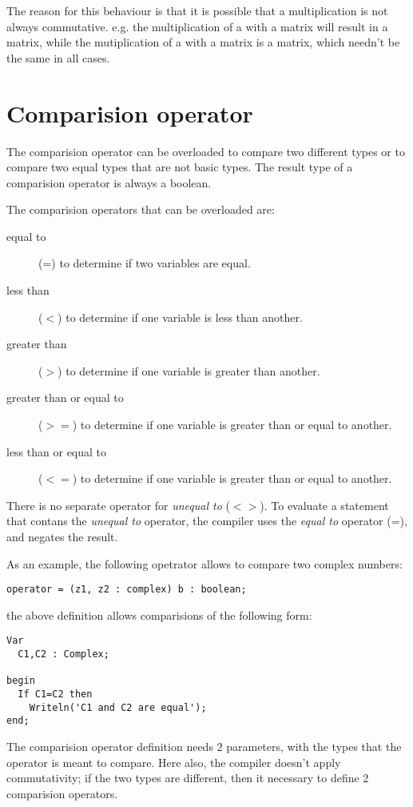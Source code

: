 \documentclass{report}
\begin{document}
The reason for this behaviour is that it is possible that a multiplication
is not always commutative. e.g. the multiplication of a  with a
 matrix will result in a  matrix, while the
mutiplication of a  with a  matrix is a 
matrix, which needn't be the same in all cases.

\section{Comparision operator}
The comparision operator can be overloaded to compare two different types
or to compare two equal types that are not basic types. The result type of
a comparision operator is always a boolean.

The comparision operators that can be overloaded are:
\begin{description}
\item[equal to] (=) to determine if two variables are equal.
\item[less than] ($<$) to determine if one variable is less than another.
\item[greater than] ($>$) to determine if one variable is greater than another.
\item[greater than or equal to] ($>=$) to determine if one variable is greater than
or equal to another.
\item[less than or equal to] ($<=$) to determine if one variable is greater 
than or equal to another.
\end{description}
There is no separate operator for {\em unequal to} ($<>$). To evaluate a
statement that contans the {\em unequal to} operator, the compiler uses the 
{\em equal to} operator (=), and negates the result.


As an example, the following opetrator allows to compare two complex
numbers:
\begin{verbatim}
operator = (z1, z2 : complex) b : boolean;
\end{verbatim}
the above definition allows comparisions of the following form:
\begin{verbatim}
Var
  C1,C2 : Complex;

begin
  If C1=C2 then
    Writeln('C1 and C2 are equal');
end;
\end{verbatim}

The comparision operator definition needs 2 parameters, with the types that
the operator is meant to compare. Here also, the compiler doesn't apply
commutativity; if the two types are different, then it necessary to
define 2 comparision operators. 
\end{document}
